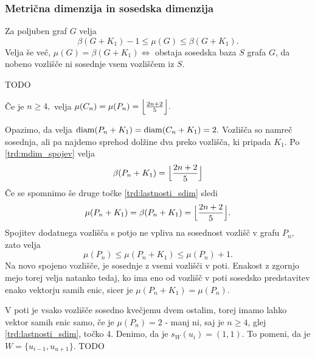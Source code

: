 \documentclass[mat1, tisk]{fmfdelo}
\newcommand{\1}{(1, 1, \ldots, 1)}
\newcommand{\2}{(2, 2, \ldots, 2)}
\begin{document}

\subsubsection{Metrična dimenzija in sosedska dimenzija} \label{ss:mdim_sdim}

\begin{trditev} \label{trd:meja_sdim}
    Za poljuben graf $G$ velja
    $$\beta(G + K_1) - 1 \leq \mu(G) \leq \beta(G + K_1).$$
    Velja še več, 
    $\mu(G) = \beta(G + K_1) \Leftrightarrow$ obstaja sosedska baza $S$ grafa $G$, 
    da nobeno vozlišče ni sosednje vsem vozliščem iz $S$.
\end{trditev}

\begin{dokaz}
    TODO
\end{dokaz}


\begin{trditev} \label{trd:sdim_pot_cikel}
    Če je $n \geq 4,$ velja $\mu(C_n) = \mu(P_n) = \Bigl \lfloor \frac{2n + 2}{5}\Bigr \rfloor. $
\end{trditev}

\begin{dokaz}
    Opazimo, da velja ${\rm diam}(P_n + K_1) = {\rm diam}(C_n + K_1) = 2.$ Vozlišča so namreč sosednja, ali 
    pa najdemo sprehod dolžine dva preko vozlišča, ki pripada $K_1$. Po \ref{trd:mdim_spojev} velja 
    $$\beta(P_n + K_1) = \Bigl \lfloor \frac{2n + 2}{5}\Bigr \rfloor$$
    Če se spomnimo še druge točke \ref{trd:lastnosti_sdim} sledi 
    $$\mu(P_n + K_1) = \beta(P_n + K_1) = \Bigl \lfloor \frac{2n + 2}{5}\Bigr \rfloor.$$
    Spojitev dodatnega vozlišča s potjo ne vpliva na sosednost vozlišč v grafu $P_n,$ zato velja
    $$\mu(P_n) \leq \mu(P_n + K_1) \leq \mu(P_n) + 1.$$
    Na novo spojeno vozlišče, je sosednje z vsemi vozlišči v poti. Enakost z zgornjo mejo torej velja natanko
    tedaj, ko ima eno od vozlišč v poti sosedsko predstavitev enako vektorju samih enic, sicer je 
    $\mu(P_n + K_1) = \mu(P_n).$
    
    V poti je vsako vozlišče sosedno kvečjemu dvem ostalim, torej imamo lahko vektor samih enic samo,
    če je $\mu(P_n) = 2$ - manj ni, saj je $n \geq 4$, glej \ref{trd:lastnosti_sdim}, točko 4.
    Denimo, da je $s_W(u_i) = (1, 1).$ To pomeni, da je $W =\{ u_{i-1}, u_{u+1}\}.$  
    TODO
\end{dokaz}
\end{document}
